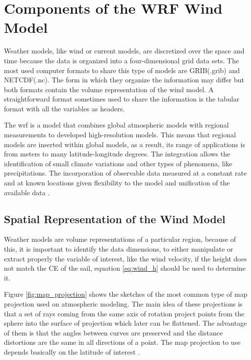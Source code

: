 \section{Components of the WRF Wind Model}
Weather models, like wind or current models, are discretized over the space and time because the data is organized into a four-dimensional grid data sets. The most used computer formats to share this type of models are GRIB(.grib) and NETCDF(.nc). The form in which they organize the information may differ but both formats contain the volume representation of the wind model. A straightforward format sometimes used to share the information is the tabular format with all the variables as headers. \par

The \acrshort{wrf} is a model that combines global atmospheric models with regional measurements to developed high-resolution models. This means that regional models are inserted within global models, as a result, its range of applications is from meters to many latitude-longitude degrees. The integration allows the identification of small climate variations and other types of phenomena, like precipitations. The incorporation of observable data measured at a constant rate and at known locations given flexibility to the model and unification of the available data \cite{warner2010numerical}. \par

\subsection{Spatial Representation of the Wind Model}

Weather models are volume representations of a particular region, because of this, it is important to identify the data dimensions, to either manipulate or extract properly the variable of interest, like the wind velocity, if the height does not match the CE of the sail, equation \ref{eq:wind_h} should be used to determine it. \par \noindent

Figure \ref{fig:map_projection} shows the sketches of the most common type of map projection used on atmospheric modeling. The main idea of these projections is that a set of rays coming from the same axis of rotation project points from the sphere into the surface of projection which later can be flattened. The advantage of them is that the angles between curves are preserved and the distance distortions are the same in all directions of a point. The map projection to use depends basically on the latitude of interest \cite{warner2010numerical}. \par


